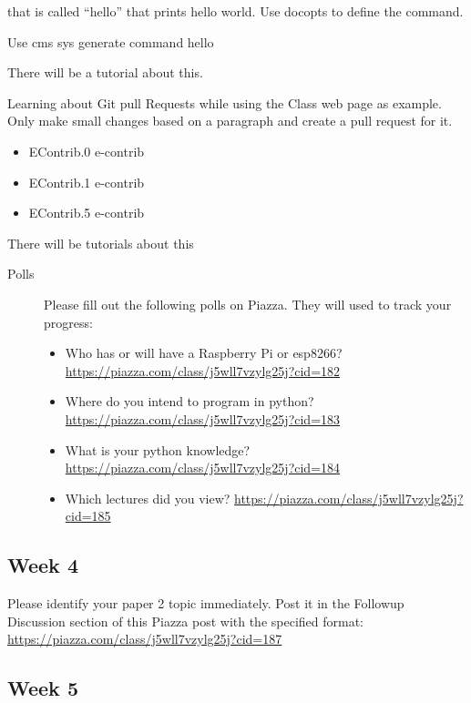 that is called ``hello'' that prints hello world. Use docopts to define
the command.

Use cms sys generate command hello

There will be a tutorial about this.

Learning about Git pull Requests while using the Class web page as
example. Only make small changes based on a paragraph and create a pull
request for it.

\begin{itemize}

\item
  EContrib.0 e-contrib
\item
  EContrib.1 e-contrib
\item
  EContrib.5 e-contrib
\end{itemize}

There will be tutorials about this

\begin{description}
\item[Polls]
Please fill out the following polls on Piazza. They will used to track
your progress:

\begin{itemize}

\item
  Who has or will have a Raspberry Pi or esp8266?
  \url{https://piazza.com/class/j5wll7vzylg25j?cid=182}
\item
  Where do you intend to program in python?
  \url{https://piazza.com/class/j5wll7vzylg25j?cid=183}
\item
  What is your python knowledge?
  \url{https://piazza.com/class/j5wll7vzylg25j?cid=184}
\item
  Which lectures did you view?
  \url{https://piazza.com/class/j5wll7vzylg25j?cid=185}
\end{itemize}
\end{description}

\subsection{Week 4}\label{week-4}

Please identify your paper 2 topic immediately. Post it in the Followup
Discussion section of this Piazza post with the specified format:
\url{https://piazza.com/class/j5wll7vzylg25j?cid=187}

\subsection{Week 5}\label{week-5}

